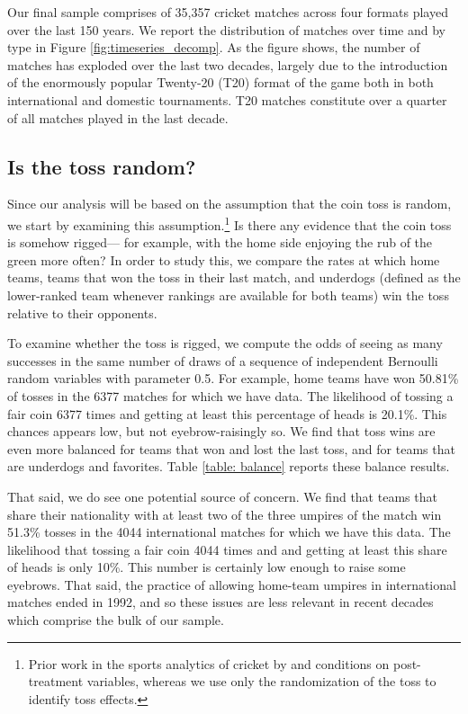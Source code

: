 \documentclass[11pt,  letterpaper]{article}
\begin{document}
Our final sample comprises of 35,357 cricket matches across four formats played over the last 150 years. We report the distribution of matches over time and by type in Figure \ref{fig:timeseries_decomp}. As the figure shows, the number of matches has exploded over the last two decades, largely due to the introduction of the enormously popular Twenty-20 (T20) format of the game both in both international and domestic tournaments. T20 matches constitute over a quarter of all matches played in the last decade.


\subsection{Is the toss random?}

Since our analysis will be based on the assumption that the coin toss is random, we start by examining this assumption.\footnote{Prior work in the sports analytics of cricket by \citet{shafqat2015analysis} and \citet{dawson2009bat} conditions on post-treatment variables, whereas we use only the randomization of the toss to identify toss effects.} Is there any evidence that the coin toss is somehow rigged--- for example, with the home side enjoying the rub of the green more often? In order to study this, we compare the rates at which home teams, teams that won the toss in their last match, and underdogs (defined as the lower-ranked team whenever rankings are available for both teams) win the toss relative to their opponents. 

To examine whether the toss is rigged, we compute the odds of seeing as many successes in the same number of draws of a sequence of independent Bernoulli random variables with parameter 0.5. For example, home teams have won 50.81\% of tosses in the 6377 matches for which we have data. The likelihood of tossing a fair coin 6377 times and getting at least this percentage of heads is 20.1\%. This chances appears low, but not eyebrow-raisingly so. We find that toss wins are even more balanced for teams that won and lost the last toss, and for teams that are underdogs and favorites. Table \ref{table: balance} reports these balance results. 

That said, we do see one potential source of concern. We find that teams that share their nationality with at least two of the three umpires of the match win 51.3\% tosses in the 4044 international matches for which we have this data. The likelihood that tossing a fair coin 4044 times and and getting at least this share of heads is only 10\%. This number is certainly low enough to raise some eyebrows. That said, the practice of allowing home-team umpires in international matches ended in 1992, and so these issues are less relevant in recent decades which comprise the bulk of our sample. 
\end{document}
